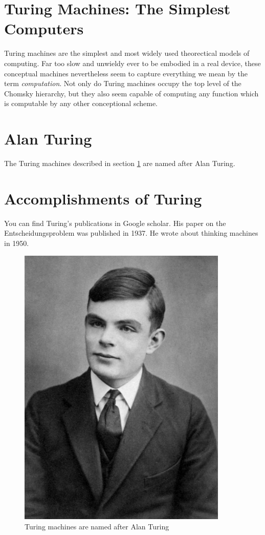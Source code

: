 \documentclass[a4paper]{article}
\begin{document}
\section{Turing Machines: The Simplest Computers}
\label{sec:simplest} %
Turing machines are the simplest and most widely used theorectical models of computing. Far too slow and unwieldy ever to be embodied in a real device, these conceptual machines nevertheless seem to capture everything we mean by the term \textit{computation}. Not only do Turing machines occupy the top level of the Chomsky hierarchy, but they also seem capable of computing any function which is computable by any other conceptional scheme.

\section{Alan Turing}
The Turing machines described in section \ref{sec:simplest} are named after Alan Turing. %

\section{Accomplishments of Turing}
You can find Turing's publications in Google scholar. \cite{googlescholar} His paper on the Entscheidungsproblem was published in 1937. \cite{alanturing} He wrote about thinking machines in 1950. \cite{turingomnibus}
\begin{figure}
    \centering
    \includegraphics[width=10cm]{turing.jpg}
    \caption{Turing machines are named after Alan Turing}
    \label{figure:turing}
\end{figure}


\end{document}
